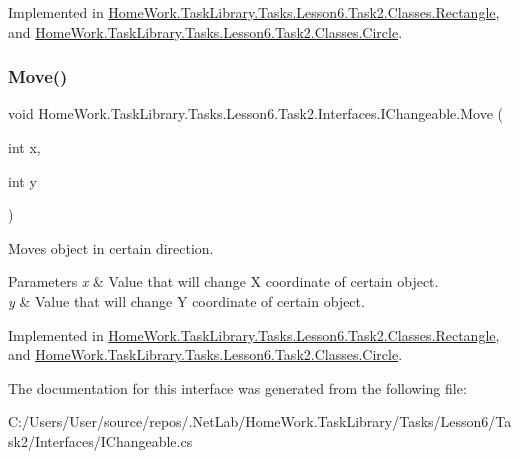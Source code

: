 Implemented in \mbox{\hyperlink{class_home_work_1_1_task_library_1_1_tasks_1_1_lesson6_1_1_task2_1_1_classes_1_1_rectangle_a320867e44519eebbff5887919557b996}{Home\+Work.\+Task\+Library.\+Tasks.\+Lesson6.\+Task2.\+Classes.\+Rectangle}}, and \mbox{\hyperlink{class_home_work_1_1_task_library_1_1_tasks_1_1_lesson6_1_1_task2_1_1_classes_1_1_circle_ab8d3d404b5c85359896d5789a804faac}{Home\+Work.\+Task\+Library.\+Tasks.\+Lesson6.\+Task2.\+Classes.\+Circle}}.

\mbox{\label{interface_home_work_1_1_task_library_1_1_tasks_1_1_lesson6_1_1_task2_1_1_interfaces_1_1_i_changeable_a86e3712a90bdc833d17cff47cdfd7923}} 
\subsubsection{\texorpdfstring{Move()}{Move()}}
{\footnotesize\ttfamily void Home\+Work.\+Task\+Library.\+Tasks.\+Lesson6.\+Task2.\+Interfaces.\+I\+Changeable.\+Move (\begin{DoxyParamCaption}\item[{int}]{x,  }\item[{int}]{y }\end{DoxyParamCaption})}



Moves object in certain direction. 


\begin{DoxyParams}{Parameters}
{\em x} & Value that will change X coordinate of certain object.\\
\hline
{\em y} & Value that will change Y coordinate of certain object.\\
\hline
\end{DoxyParams}


Implemented in \mbox{\hyperlink{class_home_work_1_1_task_library_1_1_tasks_1_1_lesson6_1_1_task2_1_1_classes_1_1_rectangle_ae585cf633082fb4d72098a72161d49a5}{Home\+Work.\+Task\+Library.\+Tasks.\+Lesson6.\+Task2.\+Classes.\+Rectangle}}, and \mbox{\hyperlink{class_home_work_1_1_task_library_1_1_tasks_1_1_lesson6_1_1_task2_1_1_classes_1_1_circle_aa133b87121d3a40da2612a9e72a3c0f4}{Home\+Work.\+Task\+Library.\+Tasks.\+Lesson6.\+Task2.\+Classes.\+Circle}}.



The documentation for this interface was generated from the following file\+:\begin{DoxyCompactItemize}
\item 
C\+:/\+Users/\+User/source/repos/.\+Net\+Lab/\+Home\+Work.\+Task\+Library/\+Tasks/\+Lesson6/\+Task2/\+Interfaces/I\+Changeable.\+cs\end{DoxyCompactItemize}
